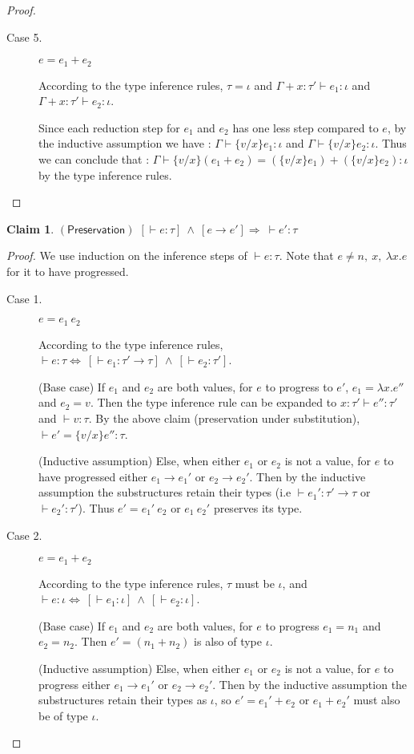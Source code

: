 \documentclass{article}
\newtheorem{clm}{Claim}[section]
\begin{document}
\begin{proof}
\begin{description}
\item[Case 5.] $e = e_1 + e_2$

According to the type inference rules, $\tau = \iota$ and $\Gamma + x : \tau' \vdash e_1 : \iota$ and $\Gamma + x : \tau' \vdash e_2 : \iota$.

Since each reduction step for $e_1$ and $e_2$ has one less step compared to $e$, by the inductive assumption we have : $\Gamma \vdash \{v/x\}e_1 : \iota$ and $\Gamma \vdash \{v/x\}e_2 : \iota$. Thus we can conclude that : $\Gamma \vdash \{v/x\}(e_1 + e_2) = (\{v/x\}e_1) +(\{v/x\}e_2) : \iota$ by the type inference rules.

\end{description}
\end{proof}

\begin{clm}$\mathsf{(Preservation)}$
$[\vdash e : \tau] \:\wedge\: [e \rightarrow e'] \Rightarrow\: \vdash e' : \tau$
\end{clm}
\begin{proof}
We use induction on the inference steps of $\vdash e: \tau$. Note that $e \neq n,\: x,\: \lambda x.e$ for it to have progressed.
\begin{description}
\item[Case 1.] $e = e_1 \: e_2$

According to the type inference rules, $\vdash e : \tau \Leftrightarrow \: [\vdash e_1 : \tau' \rightarrow \tau] \:\wedge\: [\vdash e_2 : \tau']$.

(Base case) If $e_1$ and $e_2$ are both values, for $e$ to progress to $e'$, $e_1 = \lambda x.e''$ and $e_2 = v$. Then the type inference rule can be expanded to $x : \tau' \vdash e'' : \tau'$ and $\vdash v : \tau$. By the above claim (preservation under substitution), $\vdash e' = \{v/x\}e'' : \tau$.

(Inductive assumption) Else, when either $e_1$ or $e_2$ is not a value, for $e$ to have progressed either $e_1 \rightarrow e_1'$ or $e_2 \rightarrow e_2'$. Then by the inductive assumption the substructures retain their types (i.e $\vdash e_1' : \tau' \rightarrow \tau$ or $\vdash e_2' : \tau'$). Thus $e' = e_1' \: e_2$ or $e_1 \: e_2'$ preserves its type.

\item[Case 2.] $e = e_1 + e_2$

According to the type inference rules, $\tau$ must be $\iota$, and $\vdash e : \iota \Leftrightarrow \: [\vdash e_1 : \iota] \:\wedge\: [\vdash e_2 : \iota]$.

(Base case) If $e_1$ and $e_2$ are both values, for $e$ to progress $e_1 = n_1$ and $e_2 = n_2$. Then $e' = (n_1 + n_2)$ is also of type $\iota$.

(Inductive assumption) Else, when either $e_1$ or $e_2$ is not a value, for $e$ to progress either $e_1 \rightarrow e_1'$ or $e_2 \rightarrow e_2'$. Then by the inductive assumption the substructures retain their types as $\iota$, so $e'=e_1' + e_2$ or $e_1 + e_2'$ must also be of type $\iota$.
\end{description}
\end{proof}
\end{document}
